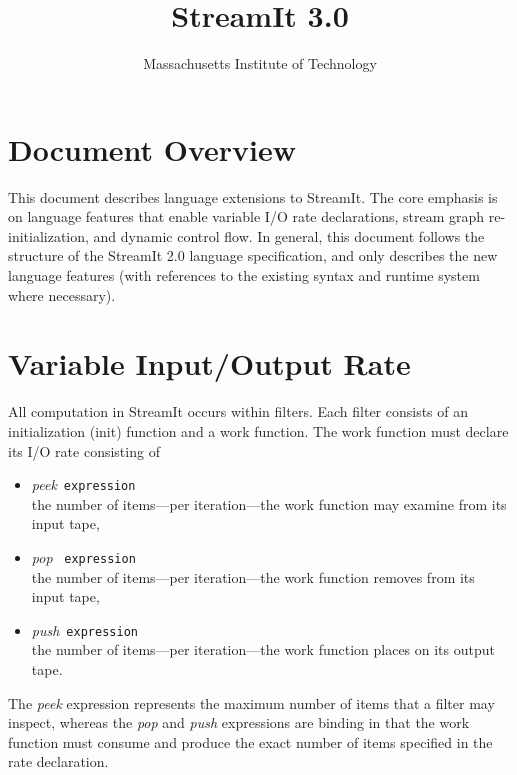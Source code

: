\documentclass{tr}
\title{StreamIt 3.0}
\author{Massachusetts Institute of Technology}
\begin{document}
\maketitle


\section{Document Overview}

This  document describes  language  extensions to  StreamIt. The  core
emphasis  is  on  language  features  that enable  variable  I/O  rate
declarations,  stream  graph  re-initialization, and  dynamic  control
flow.  In general, this document follows the structure of the StreamIt
2.0  language  specification,  and  only describes  the  new  language
features (with  references to the  existing syntax and  runtime system
where necessary).



\section{Variable Input/Output Rate}

All  computation  in  StreamIt  occurs within  filters.   Each  filter
consists  of an initialization  (init) function  and a  work function.
The work function  must declare its I/O rate  consisting of
\begin{itemize}
\item {\it peek}~\texttt{expression}\\the number of items---per
  iteration---the work function may examine from its input tape,
\item {\it pop }~\texttt{expression}\\the number of items---per
  iteration---the work function  removes from its input tape,
\item {\it push}~\texttt{expression}\\the number of items---per
  iteration---the work function places on its  output tape.
\end{itemize}
The {\it peek} expression represents  the maximum number of items that
a filter may inspect, whereas the {\it pop} and {\it push} expressions
are binding  in that  the work function  must consume and  produce the
exact number of items specified in the rate declaration.
\end{document}
